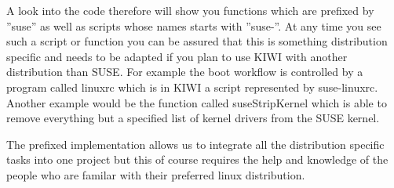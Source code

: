 A look into the code therefore will show you functions which are
prefixed by ''suse'' as well as scripts whose names starts with
''suse-''. At any time you see such a script or function
you can be assured that this is something distribution specific
and needs to be adapted if you plan to use KIWI with another
distribution than SUSE. For example the boot workflow is controlled
by a program called linuxrc which is in KIWI a script represented
by suse-linuxrc. Another example would be the function called
suseStripKernel which is able to remove everything but a specified
list of kernel drivers from the SUSE kernel.

The prefixed implementation allows us to integrate all the
distribution specific tasks into one project but this of course
requires the help and knowledge of the people who are familar
with their preferred linux distribution. 
